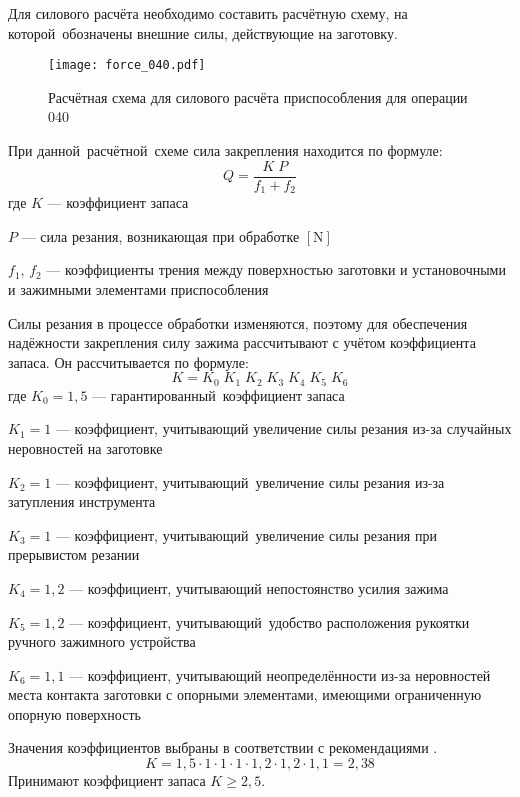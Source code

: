\documentclass[14pt,russian,a4paper]{extreport}
\begin{document}
Для силового расчёта необходимо составить расчётную схему, на которой обозначены внешние силы, действующие на заготовку.

\begin{figure}[H]
	\centering
	   \texttt{[image: force\_040.pdf]}
	   \caption{Расчётная схема для силового расчёта приспособления для операции 040}
	   \label{fig:f040}
\end{figure}

При данной расчётной схеме сила закрепления находится по формуле:
\begin{equation}
  Q = \frac{K \; P}{f_1 + f_2}
\end{equation}
где $K$ --- коэффициент запаса \par
$P$ --- сила резания, возникающая при обработке $\left[\si{\newton}\right]$ \par
$f_1$, $f_2$ --- коэффициенты трения между поверхностью заготовки и установочными и зажимными элементами приспособления

Силы резания в процессе обработки изменяются, поэтому для обеспечения надёжности закрепления силу зажима рассчитывают с учётом коэффициента запаса. Он рассчитывается по формуле:
\begin{equation}
  K = K_0 \; K_1 \; K_2 \; K_3 \; K_4 \; K_5 \; K_6
\end{equation}
где $K_0 = 1,5$ --- гарантированный коэффициент запаса \par
$K_1 = 1$ --- коэффициент, учитывающий увеличение силы резания из-за случайных неровностей на заготовке\par
$K_2 = 1$ --- коэффициент, учитывающий увеличение силы резания из-за затупления инструмента \par
$K_3 = 1$ --- коэффициент, учитывающий увеличение силы резания при прерывистом резании \par
$K_4 = 1,2$ --- коэффициент, учитывающий непостоянство усилия зажима \par
$K_5 = 1,2$ --- коэффициент, учитывающий удобство расположения рукоятки ручного зажимного устройства \par
$K_6 = 1,1$ --- коэффициент, учитывающий неопределённости из-за неровностей места контакта заготовки с опорными элементами, имеющими ограниченную опорную поверхность

Значения коэффициентов выбраны в соответствии с рекомендациями \cite[разд.~4.1]{tarabarin:pto}.
\begin{equation*}
  K = 1,5 \cdot 1 \cdot 1 \cdot 1 \cdot 1,2 \cdot 1,2 \cdot 1,1 = 2,38
\end{equation*}
Принимают коэффициент запаса $K \geq 2,5$.
\end{document}

